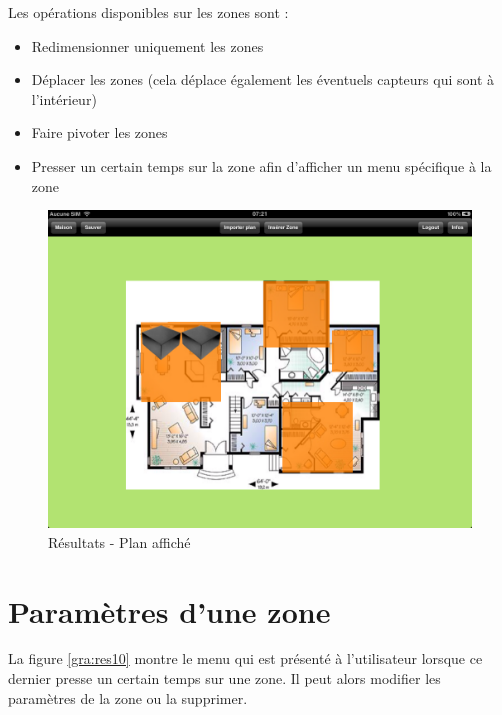 \medskip

Les opérations disponibles sur les zones sont : 

\medskip

\begin{itemize}
    \item Redimensionner uniquement les zones
    \item Déplacer les zones (cela déplace également les éventuels capteurs qui sont à l'intérieur)
    \item Faire pivoter les zones
    \item Presser un certain temps sur la zone afin d'afficher un menu spécifique à la zone
\end{itemize}

\begin{figure}[H]
        \centering
        \includegraphics[width=\textwidth]{00_media/07_09.PNG}
        \caption{Résultats - Plan affiché}
        \label{gra:res09}
\end{figure}

\clearpage

\section{Paramètres d'une zone} %
\label{sub:param_tres_d_une_zone}
La figure \ref{gra:res10} montre le menu qui est présenté à l'utilisateur lorsque ce dernier presse un certain temps sur une zone. Il peut alors modifier les paramètres de la zone ou la supprimer.


